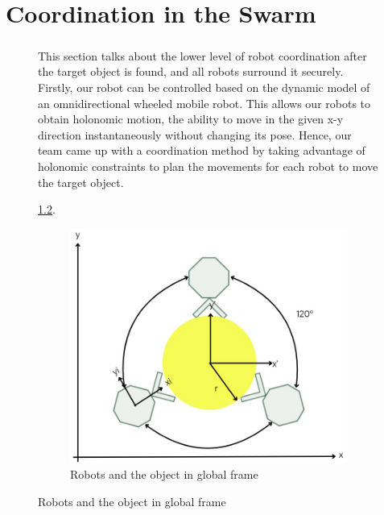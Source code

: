 \chapter{Coordination in the Swarm}

\begin{figure} [H]

\paragraph*{}
This section talks about the lower level of robot coordination after the target object is found, and all robots surround it securely. Firstly, our robot can be controlled based on the dynamic model of an omnidirectional wheeled mobile robot. This allows our robots to obtain holonomic motion, the ability to move in the given x-y direction instantaneously without changing its pose. Hence, our team came up with a coordination method by taking advantage of holonomic constraints to plan the movements for each robot to move the target object.

\ref{fig:coordination-diagram}.

\begin{figure} [H]
    \centering
    \includegraphics[width=0.5\linewidth]{assets/images/coordination/robots_with_object.jpg}
    \caption{Robots and the object in global frame}
    \label{fig:coordination-diagram}
\end{figure}


\end{figure}
